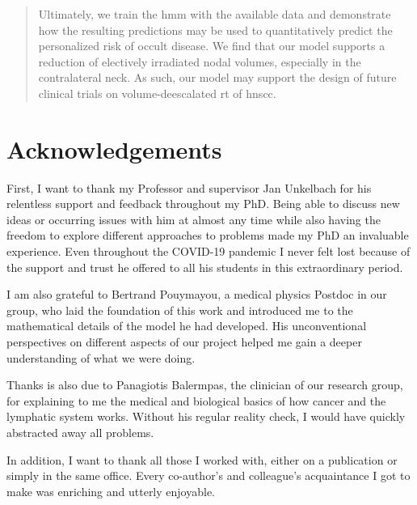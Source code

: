 \documentclass[\relativeRoot/main.tex]{subfiles}
\begin{document}
\begin{abstract}
    Ultimately, we train the \gls{hmm} with the available data and demonstrate how the resulting predictions may be used to quantitatively predict the personalized risk of occult disease. We find that our model supports a reduction of electively irradiated nodal volumes, especially in the contralateral neck. As such, our model may support the design of future clinical trials on volume-deescalated \acrlong{rt} of \gls{hnscc}.
\end{abstract}



\chapter*{Acknowledgements}
First, I want to thank my Professor and supervisor Jan Unkelbach for his relentless support and feedback throughout my PhD. Being able to discuss new ideas or occurring issues with him at almost any time while also having the freedom to explore different approaches to problems made my PhD an invaluable experience. Even throughout the COVID-19 pandemic I never felt lost because of the support and trust he offered to all his students in this extraordinary period.

I am also grateful to Bertrand Pouymayou, a medical physics Postdoc in our group, who laid the foundation of this work and introduced me to the mathematical details of the model he had developed. His unconventional perspectives on different aspects of our project helped me gain a deeper understanding of what we were doing.

Thanks is also due to Panagiotis Balermpas, the clinician of our research group, for explaining to me the medical and biological basics of how cancer and the lymphatic system works. Without his regular reality check, I would have quickly abstracted away all problems.

In addition, I want to thank all those I worked with, either on a publication or simply in the same office. Every co-author's and colleague's acquaintance I got to make was enriching and utterly enjoyable.
\end{document}
